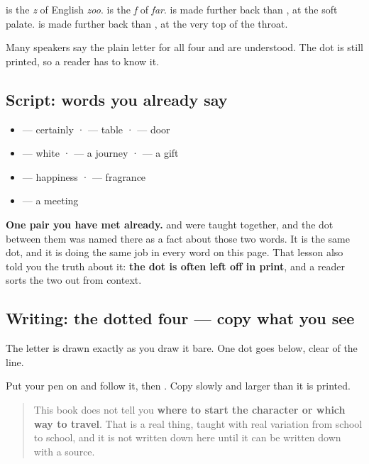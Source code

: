 \textbf{} is the \emph{z} of English \emph{zoo}. \textbf{} is the \emph{f} of \emph{far}. \textbf{} is made further back than \textbf{}, at the soft palate. \textbf{} is made further back than \textbf{}, at the very top of the throat.

Many speakers say the plain letter for all four and are understood. The dot is still printed, so a reader has to know it.

\subsection*{Script: words you already say}
\begin{itemize}
\raggedright
  \item \textbf{} — certainly · \textbf{} — table · \textbf{} — door
  \item \textbf{} — white · \textbf{} — a journey · \textbf{} — a gift
  \item \textbf{} — happiness · \textbf{} — fragrance
  \item \textbf{} — a meeting
\end{itemize}

\textbf{One pair you have met already.} \textbf{} and \textbf{} were taught together, and the dot between them was named there as a fact about those two words. It is the same dot, and it is doing the same job in every word on this page. That lesson also told you the truth about it: \textbf{the dot is often left off in print}, and a reader sorts the two out from context.

\subsection*{Writing: the dotted four — copy what you see}
The letter is drawn exactly as you draw it bare. One dot goes below, clear of the line.

Put your pen on \textbf{} and follow it, then \textbf{}. Copy slowly and larger than it is printed.

\begin{quote}
This book does not tell you \textbf{where to start the character or which way to travel}. That is a real thing, taught with real variation from school to school, and it is not written down here until it can be written down with a source.
\end{quote}

